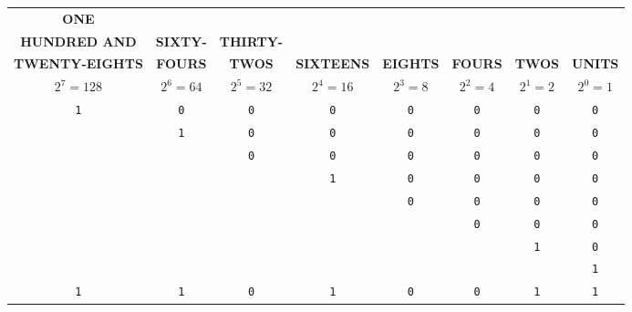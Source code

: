 \begin{center}
  \begin{tabular}{|c|c|c|c|c|c|c|c|}
  \hline
  	\small{\bf ONE} & & & & & & &  \\
    \small{\bf HUNDRED AND} & \small{\bf SIXTY-} & \small{\bf THIRTY-} &  &  & &  & \\
    \small{\bf TWENTY-EIGHTS} & \small{\bf FOURS} & \small{\bf TWOS} & \small{\bf SIXTEENS} & \small{\bf EIGHTS} & \small{\bf FOURS} & \small{\bf TWOS} & \small{\bf UNITS} \\ \hline
	  \small{$2^{7} = 128$} & \small{$2^{6} = 64$} & \small{$2^{5} = 32$} & \small{$2^{4} = 16$} & \small{$2^{3} = 8$} & \small{$2^{2} = 4$} & \small{$2^{1} = 2$} & \small{$2^{0} = 1$} \\ \hhline{|=|=|=|=|=|=|=|=|}
	  \large{\texttt{1}} & \large{\texttt{0}} & \large{\texttt{0}} & \large{\texttt{0}} & \large{\texttt{0}} & \large{\texttt{0}} & \large{\texttt{0}} & \large{\texttt{0}} \\ \hline
	            & \large{\texttt{1}} & \large{\texttt{0}} & \large{\texttt{0}} & \large{\texttt{0}} & \large{\texttt{0}} & \large{\texttt{0}} & \large{\texttt{0}} \\ \hline
	            &           & \large{\texttt{0}} & \large{\texttt{0}} & \large{\texttt{0}} & \large{\texttt{0}} & \large{\texttt{0}} & \large{\texttt{0}} \\ \hline
	            &           &           & \large{\texttt{1}} & \large{\texttt{0}} & \large{\texttt{0}} & \large{\texttt{0}} & \large{\texttt{0}} \\ \hline
	            &           &           &           & \large{\texttt{0}} & \large{\texttt{0}} & \large{\texttt{0}} & \large{\texttt{0}} \\ \hline
	            &           &           &           &           & \large{\texttt{0}} & \large{\texttt{0}} & \large{\texttt{0}} \\ \hline
	            &           &           &           &           &           & \large{\texttt{1}} & \large{\texttt{0}} \\ \hline
	  					&           &           &           &           &           &           & \large{\texttt{1}} \\ \hhline{|=|=|=|=|=|=|=|=|}
	 \Large{\texttt{1}}  & \Large{\texttt{1}}   & \Large{\texttt{0}}  & \Large{\texttt{1}}  & \Large{\texttt{0}}  & \Large{\texttt{0}}  & \Large{\texttt{1}} & \Large{\texttt{1}} \\ \hline
  \end{tabular}
\end{center}

